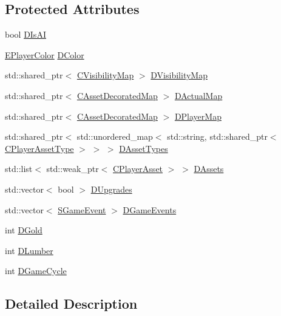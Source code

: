 \subsection*{Protected Attributes}
\begin{DoxyCompactItemize}
\item 
bool \hyperlink{classCPlayerData_ad3fcb8740d4e37b4654c01c8c595e6d5}{D\+Is\+AI}
\item 
\hyperlink{GameDataTypes_8h_aafb0ca75933357ff28a6d7efbdd7602f}{E\+Player\+Color} \hyperlink{classCPlayerData_a65d69aaa09c8fc0f7ddfa5e858313085}{D\+Color}
\item 
std\+::shared\+\_\+ptr$<$ \hyperlink{classCVisibilityMap}{C\+Visibility\+Map} $>$ \hyperlink{classCPlayerData_a804ea65e7ec7c90b2e335414d106cc78}{D\+Visibility\+Map}
\item 
std\+::shared\+\_\+ptr$<$ \hyperlink{classCAssetDecoratedMap}{C\+Asset\+Decorated\+Map} $>$ \hyperlink{classCPlayerData_a943801106af1d7ad52abd73d32552186}{D\+Actual\+Map}
\item 
std\+::shared\+\_\+ptr$<$ \hyperlink{classCAssetDecoratedMap}{C\+Asset\+Decorated\+Map} $>$ \hyperlink{classCPlayerData_a452163191cd4603e1e38dd8d4bb9691c}{D\+Player\+Map}
\item 
std\+::shared\+\_\+ptr$<$ std\+::unordered\+\_\+map$<$ std\+::string, std\+::shared\+\_\+ptr$<$ \hyperlink{classCPlayerAssetType}{C\+Player\+Asset\+Type} $>$ $>$ $>$ \hyperlink{classCPlayerData_ad922f283c60b1c885dac955815ae2b05}{D\+Asset\+Types}
\item 
std\+::list$<$ std\+::weak\+\_\+ptr$<$ \hyperlink{classCPlayerAsset}{C\+Player\+Asset} $>$ $>$ \hyperlink{classCPlayerData_a1d7dd355facf52db6242e3554373906c}{D\+Assets}
\item 
std\+::vector$<$ bool $>$ \hyperlink{classCPlayerData_ae7cb90c31ec46b65ba88485368a4b96a}{D\+Upgrades}
\item 
std\+::vector$<$ \hyperlink{structSGameEvent}{S\+Game\+Event} $>$ \hyperlink{classCPlayerData_a9a7af43e88055d6d1a384a8817a655a0}{D\+Game\+Events}
\item 
int \hyperlink{classCPlayerData_afa66ff31262c9b287ae8c13259aae6f3}{D\+Gold}
\item 
int \hyperlink{classCPlayerData_adf3bf2fa49b5c8a4fb9a478d95f688c4}{D\+Lumber}
\item 
int \hyperlink{classCPlayerData_ae92ca06a63a01681dd9f3ddc17c0e106}{D\+Game\+Cycle}
\end{DoxyCompactItemize}


\subsection{Detailed Description}


